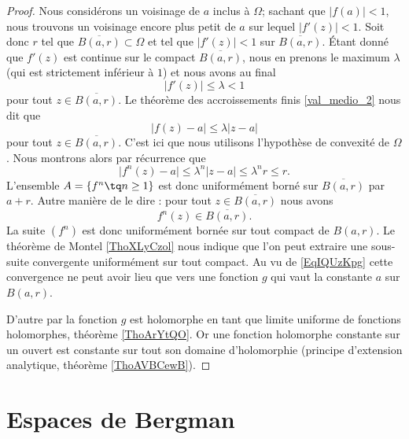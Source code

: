 \begin{proof}
    Nous considérons un voisinage de \( a\) inclus à \( \Omega\); sachant que \( | f(a) |<1\), nous trouvons un voisinage encore plus petit de \( a\) sur lequel \( | f'(z) |<1\).  Soit donc \( r\) tel que \( \overline{ B(a,r) }\subset \Omega\) et tel que \( | f'(z) |<1\) sur \( \overline{ B(a,r) }\). Étant donné que \( f'(z)\) est continue sur le compact \( \overline{ B(a,r) }\), nous en prenons le maximum \( \lambda\) (qui est strictement inférieur à \( 1\)) et nous avons au final
    \begin{equation}
        | f'(z) |\leq \lambda< 1
    \end{equation}
    pour tout \( z\in \overline{ B(a,r) }\). Le théorème des accroissements finis \ref{val_medio_2} nous dit que
    \begin{equation}
        \big| f(z)-a \big|\leq \lambda| z-a |
    \end{equation}
    pour tout \( z\in\overline{ B(a,r) }\). C'est ici que nous utilisons l'hypothèse de convexité de \( \Omega\). Nous montrons alors par récurrence que 
    \begin{equation}    \label{EqIQUzKpg}
        \big| f^n(z)-a \big|\leq \lambda^n| z-a |\leq \lambda^nr\leq r.
    \end{equation}
    L'ensemble \( A=\{ f^n\tq n\geq 1 \}\) est donc uniformément borné sur \( \overline{ B(a,r) }\) par \( a+r\). Autre manière de le dire : pour tout \( z\in\overline{ B(a,r) }\) nous avons
    \begin{equation}
        f^n(z)\in\overline{ B(a,r) }.
    \end{equation}
    La suite \( (f^n)\) est donc uniformément bornée sur tout compact de \( B(a,r)\). Le théorème de Montel \ref{ThoXLyCzol} nous indique que l'on peut extraire une sous-suite convergente uniformément sur tout compact. Au vu de \eqref{EqIQUzKpg} cette convergence ne peut avoir lieu que vers une fonction \( g\) qui vaut la constante \( a\) sur \( B(a,r)\).

    D'autre par la fonction \( g\) est holomorphe en tant que limite uniforme de fonctions holomorphes, théorème \ref{ThoArYtQO}. Or une fonction holomorphe constante sur un ouvert est constante sur tout son domaine d'holomorphie (principe d'extension analytique, théorème \ref{ThoAVBCewB}).
\end{proof}


\section{Espaces de Bergman}

